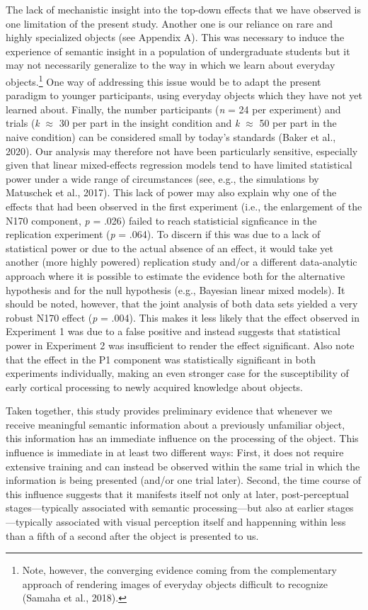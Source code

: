 \documentclass[
  english,
  man,floatsintext]{apa7}
\begin{document}
The lack of mechanistic insight into the top-down effects that we have observed is one limitation of the present study. Another one is our reliance on rare and highly specialized objects (see Appendix A). This was necessary to induce the experience of semantic insight in a population of undergraduate students but it may not necessarily generalize to the way in which we learn about everyday objects.\footnote{Note, however, the converging evidence coming from the complementary approach of rendering images of everyday objects difficult to recognize (Samaha et al., 2018).} One way of addressing this issue would be to adapt the present paradigm to younger participants, using everyday objects which they have not yet learned about. Finally, the number participants (\emph{n} = 24 per experiment) and trials (\emph{k} \(\approx\) 30 per part in the insight condition and \emph{k} \(\approx\) 50 per part in the naive condition) can be considered small by today's standards (Baker et al., 2020). Our analysis may therefore not have been particularly sensitive, especially given that linear mixed-effects regression models tend to have limited statistical power under a wide range of circumstances (see, e.g., the simulations by Matuschek et al., 2017). This lack of power may also explain why one of the effects that had been observed in the first experiment (i.e., the enlargement of the N170 component, \emph{p} = .026) failed to reach statisticial signficance in the replication experiment (\emph{p} = .064). To discern if this was due to a lack of statistical power or due to the actual absence of an effect, it would take yet another (more highly powered) replication study and/or a different data-analytic approach where it is possible to estimate the evidence both for the alternative hypothesis and for the null hypothesis (e.g., Bayesian linear mixed models). It should be noted, however, that the joint analysis of both data sets yielded a very robust N170 effect (\emph{p} = .004). This makes it less likely that the effect observed in Experiment 1 was due to a false positive and instead suggests that statistical power in Experiment 2 was insufficient to render the effect significant. Also note that the effect in the P1 component was statistically significant in both experiments individually, making an even stronger case for the susceptibility of early cortical processing to newly acquired knowledge about objects.

Taken together, this study provides preliminary evidence that whenever we receive meaningful semantic information about a previously unfamiliar object, this information has an immediate influence on the processing of the object. This influence is immediate in at least two different ways: First, it does not require extensive training and can instead be observed within the same trial in which the information is being presented (and/or one trial later). Second, the time course of this influence suggests that it manifests itself not only at later, post-perceptual stages---typically associated with semantic processing---but also at earlier stages---typically associated with visual perception itself and happenning within less than a fifth of a second after the object is presented to us.
\end{document}
